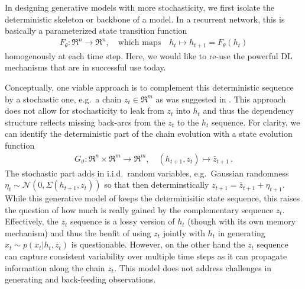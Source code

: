 \documentclass[a4paper,10pt]{article}
\begin{document}
In designing generative models with more stochasticity, we first isolate the deterministic skeleton or backbone of a model. In a recurrent network, this is basically a parameterized state transition function
\begin{align}
F_\theta: \Re^n \to \Re^n, \quad \text{which maps} \quad h_t \mapsto h_{t+1}=F_\theta(h_t)
\end{align}
homogenously at each time step. Here, we would like to re-use the powerful DL mechanisms that are in successful use today. 

Conceptually, one viable approach is to complement this deterministic sequence by a stochastic one, e.g.~a chain $z_t \in \Re^m$ as was suggested in \cite{fraccaro2016sequential}. This approach does not allow for stochasticity to leak from $z_t$  into $h_t$ and thus the dependency structure reflects missing back-arcs from the  $z_t$ to the $h_t$ sequence. For clarity, we can identify the deterministic part of the chain evolution with a state evolution function
\begin{align}
G_\vartheta: \Re^n \times \Re^m \to \Re^m, \quad (h_{t+1}, z_t) \mapsto \bar z_{t+1}\,. 
\end{align}
The stochastic part adds in i.i.d.~random variables, e.g.~Gaussian randomness $\eta_t \sim \mathcal N(0, \Sigma(h_{t+1},z_t))$ so that then determinstically $z_{t+1} = \bar z_{t+1} + \eta_{t+1}$. While this generative model of \cite{fraccaro2016sequential} keeps the  determinisitic state sequence, this raises the question of how much is really gained by the complementary sequence $z_t$. Effectively, the $z_t$ sequence is a lossy version of $h_t$ (though with its own memory mechanism) and thus the benfit of using $z_t$ jointly with $h_t$ in generating $x_t \sim p(x_t| h_t, z_t)$ is questionable. However, on the other hand the $z_t$ sequence can capture consistent variability over multiple time steps as it can propagate information along the chain $z_t$. This model does not address challenges in generating and back-feeding observations. 
\end{document}
